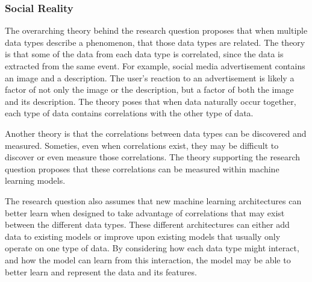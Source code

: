 \subsubsection{Social Reality}

The overarching theory behind the research question proposes that when multiple data types describe a phenomenon, that those data types are related. The theory is that some of the data from each data type is correlated, since the data is extracted from the same event.  For example, social media advertisement contains an image and a description.  The user's reaction to an advertisement is likely a factor of not only the image or the description, but a factor of both the image and its description.  The theory poses that when data naturally occur together, each type of data contains correlations with the other type of data.

Another theory is that the correlations between data types can be discovered and measured.  Someties, even when correlations exist, they may be difficult to discover or even measure those correlations.  The theory supporting the research question proposes that these correlations can be measured within machine learning models.

The research question also assumes that new machine learning architectures can better learn when designed to take advantage of correlations that may exist between the different data types.  These different architectures can either add data to existing models or improve upon existing models that usually only operate on one type of data.  By considering how each data type might interact, and how the model can learn from this interaction, the model may be able to better learn and represent the data and its features.  
